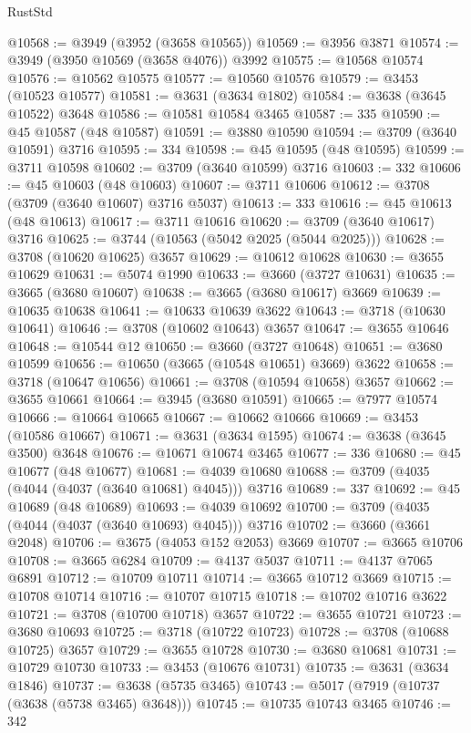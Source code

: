 \begin{lexlean}{RustStd}
\begin{coremodule}
@10568 := @3949 (@3952 (@3658 @10565))
@10569 := @3956 @3871
@10574 := @3949 (@3950 @10569 (@3658 @4076)) @3992
@10575 := @10568 @10574
@10576 := @10562 @10575
@10577 := @10560 @10576
@10579 := @3453 (@10523 @10577)
@10581 := @3631 (@3634 @1802)
@10584 := @3638 (@3645 @10522) @3648
@10586 := @10581 @10584 @3465
@10587 := 335
@10590 := @45 @10587 (@48 @10587)
@10591 := @3880 @10590
@10594 := @3709 (@3640 @10591) @3716
@10595 := 334
@10598 := @45 @10595 (@48 @10595)
@10599 := @3711 @10598
@10602 := @3709 (@3640 @10599) @3716
@10603 := 332
@10606 := @45 @10603 (@48 @10603)
@10607 := @3711 @10606
@10612 := @3708 (@3709 (@3640 @10607) @3716 @5037)
@10613 := 333
@10616 := @45 @10613 (@48 @10613)
@10617 := @3711 @10616
@10620 := @3709 (@3640 @10617) @3716
@10625 := @3744 (@10563 (@5042 @2025 (@5044 @2025)))
@10628 := @3708 (@10620 @10625) @3657
@10629 := @10612 @10628
@10630 := @3655 @10629
@10631 := @5074 @1990
@10633 := @3660 (@3727 @10631)
@10635 := @3665 (@3680 @10607)
@10638 := @3665 (@3680 @10617) @3669
@10639 := @10635 @10638
@10641 := @10633 @10639 @3622
@10643 := @3718 (@10630 @10641)
@10646 := @3708 (@10602 @10643) @3657
@10647 := @3655 @10646
@10648 := @10544 @12
@10650 := @3660 (@3727 @10648)
@10651 := @3680 @10599
@10656 := @10650 (@3665 (@10548 @10651) @3669) @3622
@10658 := @3718 (@10647 @10656)
@10661 := @3708 (@10594 @10658) @3657
@10662 := @3655 @10661
@10664 := @3945 (@3680 @10591)
@10665 := @7977 @10574
@10666 := @10664 @10665
@10667 := @10662 @10666
@10669 := @3453 (@10586 @10667)
@10671 := @3631 (@3634 @1595)
@10674 := @3638 (@3645 @3500) @3648
@10676 := @10671 @10674 @3465
@10677 := 336
@10680 := @45 @10677 (@48 @10677)
@10681 := @4039 @10680
@10688 := @3709 (@4035 (@4044 (@4037 (@3640 @10681) @4045))) @3716
@10689 := 337
@10692 := @45 @10689 (@48 @10689)
@10693 := @4039 @10692
@10700 := @3709 (@4035 (@4044 (@4037 (@3640 @10693) @4045))) @3716
@10702 := @3660 (@3661 @2048)
@10706 := @3675 (@4053 @152 @2053) @3669
@10707 := @3665 @10706
@10708 := @3665 @6284
@10709 := @4137 @5037
@10711 := @4137 @7065 @6891
@10712 := @10709 @10711
@10714 := @3665 @10712 @3669
@10715 := @10708 @10714
@10716 := @10707 @10715
@10718 := @10702 @10716 @3622
@10721 := @3708 (@10700 @10718) @3657
@10722 := @3655 @10721
@10723 := @3680 @10693
@10725 := @3718 (@10722 @10723)
@10728 := @3708 (@10688 @10725) @3657
@10729 := @3655 @10728
@10730 := @3680 @10681
@10731 := @10729 @10730
@10733 := @3453 (@10676 @10731)
@10735 := @3631 (@3634 @1846)
@10737 := @3638 (@5735 @3465)
@10743 := @5017 (@7919 (@10737 (@3638 (@5738 @3465) @3648)))
@10745 := @10735 @10743 @3465
@10746 := 342

\end{coremodule}
\end{lexlean}
